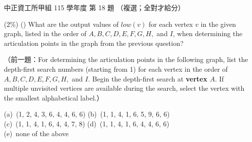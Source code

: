 \begin{pastexam}[label={px:ccu-115-swa-08}]{中正資工所甲組 115 學年度 第 18 題}
（複選；全對才給分）

(2\%) (\qquad) What are the output values of $low(v)$ for each vertex $v$ in the given graph, listed
in the order of $A, B, C, D, E, F, G, H,$ and $I$, when determining the articulation points in the
graph from the previous question?

（前一題：For determining the articulation points in the following graph, list the depth-first search
numbers (starting from 1) for each vertex in the order of $A, B, C, D, E, F, G, H,$ and $I$. Begin
the depth-first search at \textbf{vertex $A$}. If multiple unvisited vertices are available during
the search, select the vertex with the smallest alphabetical label.）
\begin{center}
\end{center}
(a)~(1, 2, 4, 3, 6, 4, 4, 6, 6) \qquad (b)~(1, 1, 4, 1, 6, 5, 9, 6, 6)\\
(c)~(1, 1, 4, 1, 6, 4, 4, 7, 8) \qquad (d)~(1, 1, 4, 1, 6, 4, 4, 6, 6)\\
(e)~none of the above
\end{pastexam}

